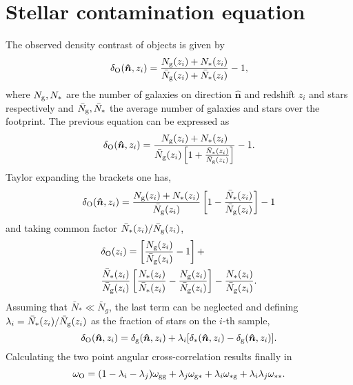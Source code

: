 \chapter{Stellar contamination equation}
\label{sec:starscorrection}
The observed density contrast of objects is given by
\begin{equation}
\delta_{\rm O}(\boldsymbol{\hat n},z_i) = \frac{N_{\rm g}(z_i)+N_*(z_i)}{\bar N_{\rm g}(z_i)+\bar N_*(z_i)}-1,
\end{equation}
where $N_{\rm g}, N_*$ are the number of galaxies on direction $\boldsymbol{\hat n}$ and redshift $z_i$ and stars respectively and $\bar N_{\rm g}, \bar N_*$ the average number of galaxies and stars over the footprint. The previous equation can be expressed as
\begin{equation}
\delta_{\rm O}(\boldsymbol{\hat n},z_i) = \frac{N_{\rm g}(z_i)+N_*(z_i)}{\bar N_{\rm g}(z_i)\left[1+\frac{\bar N_*(z_i)}{\bar N_{\rm g}(z_i)}\right]}-1.
\end{equation}
Taylor expanding the brackets one has,
\begin{equation}
\delta_{\rm O}(\boldsymbol{\hat n},z_i) = \frac{N_{\rm g}(z_i)+N_*(z_i)}{\bar N_{\rm g}(z_i)}\left[1-\frac{\bar N_*(z_i)}{\bar N_{\rm g}(z_i)}\right]-1
\end{equation}
and taking common factor $\bar N_*(z_i)/\bar N_{\rm g}(z_i)$,
\begin{eqnarray}
 &\delta_{\rm O}(z_i) = \left[\frac{N_{\rm g}(z_i)}{\bar N_{\rm g}(z_i)}-1\right]+\\
 &\frac{\bar N_*(z_i)}{\bar N_{\rm g}(z_i)}\left[\frac{N_*(z_i)}{\bar N_*(z_i)}-\frac{N_{\rm g}(z_i)}{\bar N_{\rm g}(z_i)}\right]-\frac{N_*(z_i)}{\bar N_{\rm g}(z_i)}.\nonumber
\end{eqnarray}
Assuming that $\bar N_* \ll \bar N_g$, the last term can be neglected and defining $\lambda_i = \bar N_*(z_i)/\bar N_{\rm g}(z_i)$ as the fraction of stars on the $i$-th sample,
\begin{equation}
\delta_{\rm O}(\boldsymbol{\hat n},z_i) = \delta_{\rm g}(\boldsymbol{\hat n},z_i)+\lambda_i[\delta_*(\boldsymbol{\hat n},z_i)-\delta_{\rm g}(\boldsymbol{\hat n},z_i)].
\end{equation}
Calculating the two point angular cross-correlation results finally in
\begin{equation}
\omega_{\rm O} = (1-\lambda_i-\lambda_j)\omega_{\rm gg}+\lambda_j\omega_{\rm g*}+\lambda_i\omega_{\rm *g}+\lambda_i\lambda_j\omega_{**}.
\end{equation}